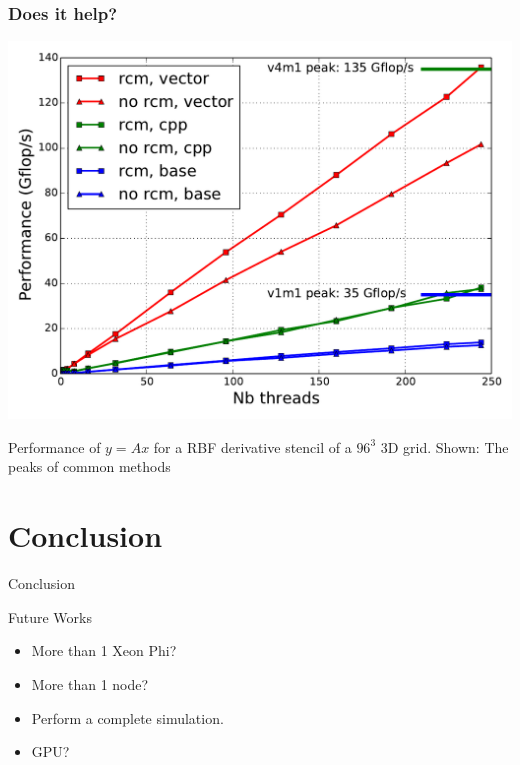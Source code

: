 \documentclass{beamer}
\begin{document}
\begin{frame}
  \frametitle{Does it help?}
  \begin{center}
    \includegraphics[width=.7\linewidth]{slides-figures/ICS-figures/mic_performance_nb_threads.pdf}
  \end{center}
  
  Performance of $y=Ax$ for a RBF derivative stencil of a $96^3$ 3D
  grid. Shown: The peaks of common methods
\end{frame}


\section{Conclusion}

\begin{frame}
  
  \begin{block}{Conclusion}
  \end{block}

  \begin{block}{Future Works}
    \begin{itemize}
    \item More than 1 Xeon Phi?
    \item More than 1 node?
    \item Perform a complete simulation.
    \item GPU?
    \end{itemize}
  \end{block}
\end{frame}



\end{document}
